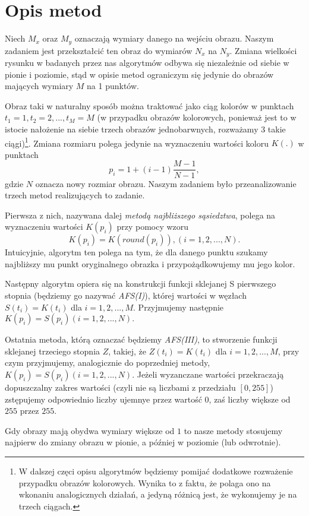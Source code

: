 \section{Opis metod}
Niech $M_x$ oraz $M_y$ oznaczają wymiary danego na wejściu obrazu. Naszym
zadaniem jest przekształcić ten obraz do wymiarów $N_x$ na $N_y$. Zmiana
wielkości rysunku w badanych przez nas algorytmów odbywa się niezależnie od
siebie w pionie i poziomie, stąd w opisie metod ograniczym się jedynie do
obrazów mających wymiary $M$ na 1 punktów.

Obraz taki w naturalny sposób można traktować jako ciąg kolorów w punktach
$t_1=1,t_2=2,...,t_M=M$ (w przypadku obrazów kolorowych, ponieważ jest to w
istocie nałożenie na siebie trzech obrazów jednobarwnych, rozważamy 3 takie
ciągi)\footnote{W dalszej częci opisu algorytmów będziemy pomijać dodatkowe
rozważenie przypadku obrazów kolorowych. Wynika to z faktu, że polaga ono na
wkonaniu analogicznych działań, a jedyną różnicą jest, że wykonujemy je na
trzech ciągach.}. Zmiana rozmiaru polega jedynie na wyznaczeniu wartości koloru
$K(.)$ w punktach
$$p_i=1+(i-1)\frac{M-1}{N-1},$$
gdzie $N$ oznacza nowy rozmiar obrazu. Naszym zadaniem było przeanalizowanie
trzech metod realizujących to zadanie.

Pierwsza z nich, nazywana dalej \textit{metodą najbliższego sąsiedztwa}, polega
na wyznaczeniu wartości $K(p_i)$ przy pomocy wzoru
$$K(p_i)=K(round(p_i)), (i=1,2,...,N).$$
Intuicyjnie, algorytm ten polega na tym, że dla danego punktu szukamy najbliższy
mu punkt oryginalnego obrazka i przypożądkowujemy mu jego kolor.

Następny algorytm opiera się na konstrukcji funkcji sklejanej S pierwszego
stopnia (będziemy go nazywać \textit{AFS(I)}), której wartości w węzłach $S(t_i)
=K(t_i)$ dla $i=1,2,...,M$. Przyjmujemy następnie $K(p_i)=S(p_i) (i=1,2,...,N).$

Ostatnia metoda, którą oznaczać będziemy \textit{AFS(III)}, to stworzenie
funkcji sklejanej trzeciego stopnia $Z$, takiej, że $Z(t_i)=K(t_i)$ dla
$i=1,2,...,M$, przy czym przyjmujemy, analogicznie do poprzedniej metody,
$K(p_i)=S(p_i) (i=1,2,...,N)$. Jeżeli wyzanczane wartości przekraczają
dopuszczalny zakres wartości (czyli nie są liczbami z przedziału $[0,255]$)
zstępujemy odpowiednio liczby ujemnye przez wartość $0$, zaś liczby większe od
$255$ przez $255$.

Gdy obrazy mają obydwa wymiary większe od $1$ to nasze metody stosujemy najpierw
do zmiany obrazu w pionie, a później w poziomie (lub odwrotnie).

